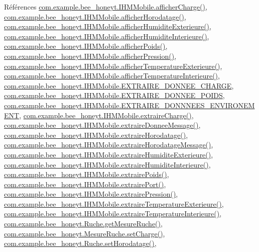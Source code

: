 Références \hyperlink{_i_h_m_mobile_8java_source_l00289}{com.\+example.\+bee\+\_\+honeyt.\+I\+H\+M\+Mobile.\+afficher\+Charge()}, \hyperlink{_i_h_m_mobile_8java_source_l00298}{com.\+example.\+bee\+\_\+honeyt.\+I\+H\+M\+Mobile.\+afficher\+Horodatage()}, \hyperlink{_i_h_m_mobile_8java_source_l00262}{com.\+example.\+bee\+\_\+honeyt.\+I\+H\+M\+Mobile.\+afficher\+Humidite\+Exterieure()}, \hyperlink{_i_h_m_mobile_8java_source_l00253}{com.\+example.\+bee\+\_\+honeyt.\+I\+H\+M\+Mobile.\+afficher\+Humidite\+Interieure()}, \hyperlink{_i_h_m_mobile_8java_source_l00271}{com.\+example.\+bee\+\_\+honeyt.\+I\+H\+M\+Mobile.\+afficher\+Poids()}, \hyperlink{_i_h_m_mobile_8java_source_l00280}{com.\+example.\+bee\+\_\+honeyt.\+I\+H\+M\+Mobile.\+afficher\+Pression()}, \hyperlink{_i_h_m_mobile_8java_source_l00244}{com.\+example.\+bee\+\_\+honeyt.\+I\+H\+M\+Mobile.\+afficher\+Temperature\+Exterieure()}, \hyperlink{_i_h_m_mobile_8java_source_l00235}{com.\+example.\+bee\+\_\+honeyt.\+I\+H\+M\+Mobile.\+afficher\+Temperature\+Interieure()}, \hyperlink{_i_h_m_mobile_8java_source_l00049}{com.\+example.\+bee\+\_\+honeyt.\+I\+H\+M\+Mobile.\+E\+X\+T\+R\+A\+I\+R\+E\+\_\+\+D\+O\+N\+N\+E\+E\+\_\+\+C\+H\+A\+R\+GE}, \hyperlink{_i_h_m_mobile_8java_source_l00047}{com.\+example.\+bee\+\_\+honeyt.\+I\+H\+M\+Mobile.\+E\+X\+T\+R\+A\+I\+R\+E\+\_\+\+D\+O\+N\+N\+E\+E\+\_\+\+P\+O\+I\+DS}, \hyperlink{_i_h_m_mobile_8java_source_l00048}{com.\+example.\+bee\+\_\+honeyt.\+I\+H\+M\+Mobile.\+E\+X\+T\+R\+A\+I\+R\+E\+\_\+\+D\+O\+N\+N\+N\+E\+E\+S\+\_\+\+E\+N\+V\+I\+R\+O\+N\+E\+M\+E\+NT}, \hyperlink{_i_h_m_mobile_8java_source_l00739}{com.\+example.\+bee\+\_\+honeyt.\+I\+H\+M\+Mobile.\+extraire\+Charge()}, \hyperlink{_i_h_m_mobile_8java_source_l00598}{com.\+example.\+bee\+\_\+honeyt.\+I\+H\+M\+Mobile.\+extraire\+Donnee\+Message()}, \hyperlink{_i_h_m_mobile_8java_source_l00676}{com.\+example.\+bee\+\_\+honeyt.\+I\+H\+M\+Mobile.\+extraire\+Horodatage()}, \hyperlink{_i_h_m_mobile_8java_source_l00638}{com.\+example.\+bee\+\_\+honeyt.\+I\+H\+M\+Mobile.\+extraire\+Horodatage\+Message()}, \hyperlink{_i_h_m_mobile_8java_source_l00442}{com.\+example.\+bee\+\_\+honeyt.\+I\+H\+M\+Mobile.\+extraire\+Humidite\+Exterieure()}, \hyperlink{_i_h_m_mobile_8java_source_l00467}{com.\+example.\+bee\+\_\+honeyt.\+I\+H\+M\+Mobile.\+extraire\+Humidite\+Interieure()}, \hyperlink{_i_h_m_mobile_8java_source_l00760}{com.\+example.\+bee\+\_\+honeyt.\+I\+H\+M\+Mobile.\+extraire\+Poids()}, \hyperlink{_i_h_m_mobile_8java_source_l00542}{com.\+example.\+bee\+\_\+honeyt.\+I\+H\+M\+Mobile.\+extraire\+Port()}, \hyperlink{_i_h_m_mobile_8java_source_l00416}{com.\+example.\+bee\+\_\+honeyt.\+I\+H\+M\+Mobile.\+extraire\+Pression()}, \hyperlink{_i_h_m_mobile_8java_source_l00492}{com.\+example.\+bee\+\_\+honeyt.\+I\+H\+M\+Mobile.\+extraire\+Temperature\+Exterieure()}, \hyperlink{_i_h_m_mobile_8java_source_l00517}{com.\+example.\+bee\+\_\+honeyt.\+I\+H\+M\+Mobile.\+extraire\+Temperature\+Interieure()}, \hyperlink{_ruche_8java_source_l00119}{com.\+example.\+bee\+\_\+honeyt.\+Ruche.\+get\+Mesure\+Ruche()}, \hyperlink{_mesure_ruche_8java_source_l00114}{com.\+example.\+bee\+\_\+honeyt.\+Mesure\+Ruche.\+set\+Charge()}, \hyperlink{_ruche_8java_source_l00106}{com.\+example.\+bee\+\_\+honeyt.\+Ruche.\+set\+Horodatage()}, 